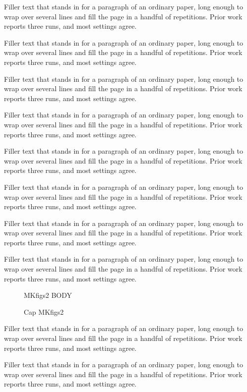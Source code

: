 \documentclass{article}
\begin{document}
Filler text that stands in for a paragraph of an ordinary paper, long enough to wrap over several lines and fill the page in a handful of repetitions. Prior work reports three runs, and most settings agree.\par
Filler text that stands in for a paragraph of an ordinary paper, long enough to wrap over several lines and fill the page in a handful of repetitions. Prior work reports three runs, and most settings agree.\par
Filler text that stands in for a paragraph of an ordinary paper, long enough to wrap over several lines and fill the page in a handful of repetitions. Prior work reports three runs, and most settings agree.\par
Filler text that stands in for a paragraph of an ordinary paper, long enough to wrap over several lines and fill the page in a handful of repetitions. Prior work reports three runs, and most settings agree.\par
Filler text that stands in for a paragraph of an ordinary paper, long enough to wrap over several lines and fill the page in a handful of repetitions. Prior work reports three runs, and most settings agree.\par
Filler text that stands in for a paragraph of an ordinary paper, long enough to wrap over several lines and fill the page in a handful of repetitions. Prior work reports three runs, and most settings agree.\par
Filler text that stands in for a paragraph of an ordinary paper, long enough to wrap over several lines and fill the page in a handful of repetitions. Prior work reports three runs, and most settings agree.\par
Filler text that stands in for a paragraph of an ordinary paper, long enough to wrap over several lines and fill the page in a handful of repetitions. Prior work reports three runs, and most settings agree.\par
\begin{figure}[t]\centering MKfigs2 BODY\caption{Cap MKfigs2}\label{fig:s2}\end{figure}
Filler text that stands in for a paragraph of an ordinary paper, long enough to wrap over several lines and fill the page in a handful of repetitions. Prior work reports three runs, and most settings agree.\par
Filler text that stands in for a paragraph of an ordinary paper, long enough to wrap over several lines and fill the page in a handful of repetitions. Prior work reports three runs, and most settings agree.\par
\end{document}
